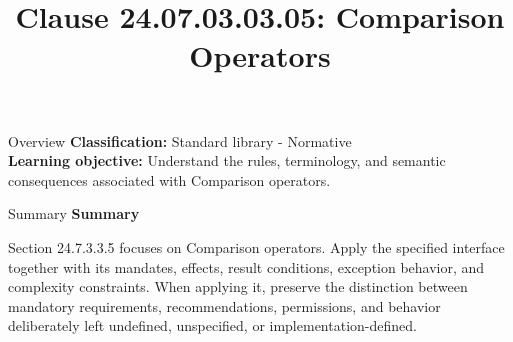 \documentclass[10pt,letterpaper]{article}
\title{Clause 24.07.03.03.05: Comparison Operators}
\author{}
\date{}
\begin{document}
\maketitle
\begin{CornellOverviewBox}{Overview}
\textbf{Classification:} Standard library - Normative\\[2pt]
\textbf{Learning objective:} Understand the rules, terminology, and semantic consequences associated with Comparison operators.
\end{CornellOverviewBox}\begin{CornellSummaryBox}{Summary}
{\sffamily\bfseries\color{Accent} Summary}\par\vspace{3pt}Section 24.7.3.3.5 focuses on Comparison operators. Apply the specified interface together with its mandates, effects, result conditions, exception behavior, and complexity constraints. When applying it, preserve the distinction between mandatory requirements, recommendations, permissions, and behavior deliberately left undefined, unspecified, or implementation-defined.
\end{CornellSummaryBox}
\end{document}
